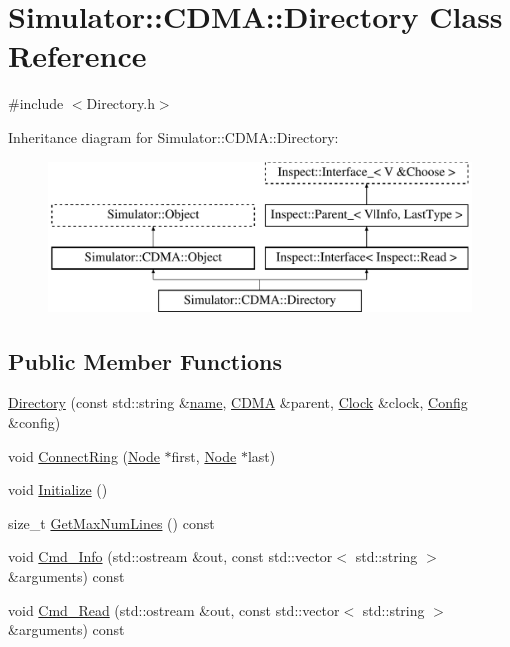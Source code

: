 \hypertarget{class_simulator_1_1_c_d_m_a_1_1_directory}{\section{Simulator\+:\+:C\+D\+M\+A\+:\+:Directory Class Reference}
\label{class_simulator_1_1_c_d_m_a_1_1_directory}
}


{\ttfamily \#include $<$Directory.\+h$>$}

Inheritance diagram for Simulator\+:\+:C\+D\+M\+A\+:\+:Directory\+:\begin{figure}[H]
\begin{center}
\leavevmode
\includegraphics[height=4.000000cm]{class_simulator_1_1_c_d_m_a_1_1_directory}
\end{center}
\end{figure}
\subsection*{Public Member Functions}
\begin{DoxyCompactItemize}
\item 
\hyperlink{class_simulator_1_1_c_d_m_a_1_1_directory_a6e9ed3ce950d24f74d3ed9aaa9936cfe}{Directory} (const std\+::string \&\hyperlink{mtconf_8c_a8f8f80d37794cde9472343e4487ba3eb}{name}, \hyperlink{class_simulator_1_1_c_d_m_a}{C\+D\+M\+A} \&parent, \hyperlink{class_simulator_1_1_clock}{Clock} \&clock, \hyperlink{class_config}{Config} \&config)
\item 
void \hyperlink{class_simulator_1_1_c_d_m_a_1_1_directory_a2ad745b38a9e58e3734836310a4e27d3}{Connect\+Ring} (\hyperlink{class_simulator_1_1_c_d_m_a_1_1_node}{Node} $\ast$first, \hyperlink{class_simulator_1_1_c_d_m_a_1_1_node}{Node} $\ast$last)
\item 
void \hyperlink{class_simulator_1_1_c_d_m_a_1_1_directory_a20969ff0db6983991457c4ccfa2c6294}{Initialize} ()
\item 
size\+\_\+t \hyperlink{class_simulator_1_1_c_d_m_a_1_1_directory_a1d7500825d442adf45815ad4c4e47685}{Get\+Max\+Num\+Lines} () const 
\item 
void \hyperlink{class_simulator_1_1_c_d_m_a_1_1_directory_a90aac41a42250f7f9b99f55883f9bff0}{Cmd\+\_\+\+Info} (std\+::ostream \&out, const std\+::vector$<$ std\+::string $>$ \&arguments) const 
\item 
void \hyperlink{class_simulator_1_1_c_d_m_a_1_1_directory_a02709fd1408c4a58cb0c3b008689774c}{Cmd\+\_\+\+Read} (std\+::ostream \&out, const std\+::vector$<$ std\+::string $>$ \&arguments) const 
\end{DoxyCompactItemize}
